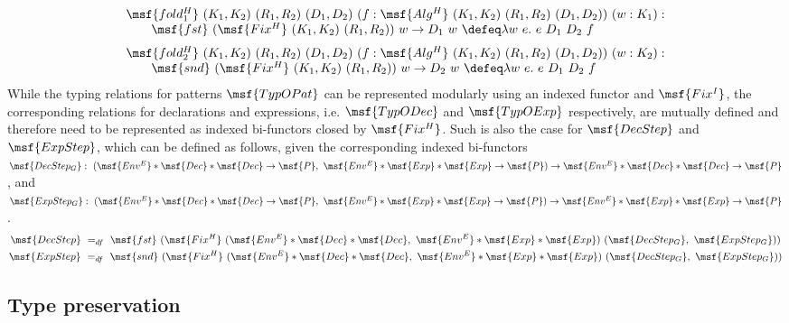 \documentclass[submission,copyright,creativecommons]{eptcs}
\begin{document}
\begin{gather} 
\begin{array}{lll}
\msf{fold^H_1} \ (K_1,K_2) \ (R_1, R_2) \ (D_1, D_2) \ (f:
\msf{Alg^H} \ (K_1,K_2) \ (R_1, R_2) \ (D_1, D_2)) \ (w:K_1):
\\ \qquad \msf{fst} \ (\msf{Fix^H} \ (K_1,K_2) \ (R_1, R_2)) \ w \to
D_1 \ w \ \defeq \lambda w \ e. \ e \ D_1 \ D_2 \ f
\end{array}
\end{gather} 
\begin{gather} 
\begin{array}{lll}
\msf{fold^H_2} \ (K_1,K_2) \ (R_1, R_2) \ (D_1, D_2) \ (f:
\msf{Alg^H} \ (K_1,K_2) \ (R_1, R_2) \ (D_1, D_2)) \ (w:K_2):
\\ \qquad \msf{snd} \ (\msf{Fix^H} \ (K_1,K_2) \ (R_1, R_2)) \ w \to
D_2 \ w \ \defeq \lambda w \ e. \ e \ D_1 \ D_2 \ f
\end{array}
\end{gather} 
While the typing relations for patterns $\msf{TypOPat}$ can be
represented modularly using an indexed functor and $\msf{Fix^I}$, the
corresponding relations for declarations and expressions,
i.e. $\msf{TypODec}$ and $\msf{TypOExp}$ respectively, are mutually
defined and therefore need to be represented as indexed bi-functors
closed by $\msf{Fix^H}$. Such is also the case for $\msf{DecStep}$ and
$\msf{ExpStep}$, which can be defined as follows, given the
corresponding indexed bi-functors $\msf{DecStep_G}: \ (\msf{Env^E} *
\msf{Dec} * \msf{Dec} \to \msf{P}, \ \msf{Env^E} * \msf{Exp} *
\msf{Exp} \to \msf{P}) \to \msf{Env^E} * \msf{Dec} * \msf{Dec} \to
\msf{P}$, and $\msf{ExpStep_G}: \ (\msf{Env^E} * \msf{Dec} * \msf{Dec}
\to \msf{P}, \ \msf{Env^E} * \msf{Exp} * \msf{Exp} \to \msf{P}) \to
\msf{Env^E} * \msf{Exp} * \msf{Exp} \to \msf{P}$.
\begin{gather} 
\msf{DecStep} \ =_{df} \ \msf{fst} \ (\msf{Fix^H} \ (\msf{Env^E} *
\msf{Dec} * \msf{Dec}, \ \msf{Env^E} * \msf{Exp} * \msf{Exp})
\ (\msf{DecStep_G}, \ \msf{ExpStep_G})) \\
\msf{ExpStep} \ =_{df} \ \msf{snd} \ (\msf{Fix^H} \ (\msf{Env^E} *
\msf{Dec} * \msf{Dec}, \ \msf{Env^E} * \msf{Exp} * \msf{Exp})
\ (\msf{DecStep_G}, \ \msf{ExpStep_G}))
\end{gather} 



\subsection{Type preservation}
\end{document}
